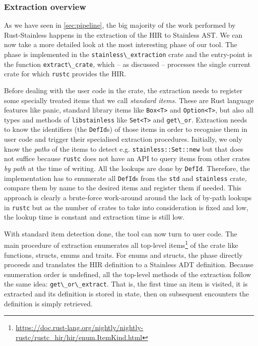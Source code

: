\subsubsection{Extraction overview}

As we have seen in \autoref{sec:pipeline}, the big majority of the work
performed by Rust-Stainless happens in the extraction of the HIR to
Stainless AST. We can now take a more detailed look at the most
interesting phase of our tool. The phase is implemented in the
\passthrough{\lstinline!stainless\_extraction!} crate and the
entry-point is the function \passthrough{\lstinline!extract\_crate!},
which -- as discussed -- processes the single current crate for which
\passthrough{\lstinline!rustc!} provides the HIR.

Before dealing with the user code in the crate, the extraction needs to
register some specially treated items that we call \emph{standard
items.} These are Rust language features like panic, standard library
items like \passthrough{\lstinline!Box<T>!} and
\passthrough{\lstinline!Option<T>!}, but also all types and methods of
\passthrough{\lstinline!libstainless!} like
\passthrough{\lstinline!Set<T>!} and \passthrough{\lstinline!get\_or!}.
Extraction needs to know the identifiers (the
\passthrough{\lstinline!DefId!}s) of those items in order to recognise
them in user code and trigger their specialised extraction procedures.
Initially, we only know the \emph{paths} of the items to detect e.g.
\passthrough{\lstinline!stainless::Set::new!} but that does not suffice
because \passthrough{\lstinline!rustc!} does not have an API to query
items from other crates \emph{by path} at the time of writing. All the
lookups are done by \passthrough{\lstinline!DefId!}. Therefore, the
implementation has to enumerate all \passthrough{\lstinline!DefId!}s
from the \passthrough{\lstinline!std!} and
\passthrough{\lstinline!stainless!} crate, compare them by name to the
desired items and register them if needed. This approach is clearly a
brute-force work-around around the lack of by-path lookups in
\passthrough{\lstinline!rustc!} but as the number of crates to take into
consideration is fixed and low, the lookup time is constant and
extraction time is still low.

With standard item detection done, the tool can now turn to user code.
The main procedure of extraction enumerates all top-level
items\footnote{\url{https://doc.rust-lang.org/nightly/nightly-rustc/rustc_hir/hir/enum.ItemKind.html}}
of the crate like functions, structs, enums and traits. For enums and
structs, the phase directly proceeds and translates the HIR definition
to a Stainless ADT definition. Because enumeration order is undefined,
all the top-level methods of the extraction follow the same idea:
\passthrough{\lstinline!get\_or\_extract!}. That is, the first time an
item is visited, it is extracted and its definition is stored in state,
then on subsequent encounters the definition is simply retrieved.


